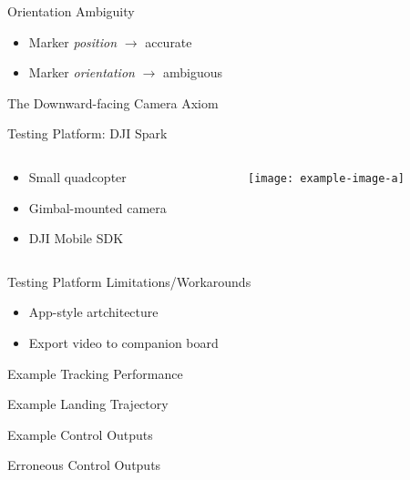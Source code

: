 \documentclass[aspectratio=169]{beamer}
\begin{document}
\begin{frame}{Orientation Ambiguity}
	\begin{itemize}
		\item Marker \emph{position} $\rightarrow$ accurate
		\item Marker \emph{orientation} $\rightarrow$ ambiguous
	\end{itemize}
\end{frame}

\begin{frame}{The Downward-facing Camera Axiom}
\end{frame}

\begin{frame}{Testing Platform: DJI Spark}
	\begin{columns}
	\begin{column}{0.5\textwidth}
	\begin{itemize}
		\item Small quadcopter
		\item Gimbal-mounted camera
		\item DJI Mobile SDK
	\end{itemize}
	\end{column}
	\begin{column}{0.5\textwidth}
		\centering
		\texttt{[image: example-image-a]}
	\end{column}
	\end{columns}
\end{frame}

\begin{frame}{Testing Platform Limitations/Workarounds}
	\begin{itemize}
		\item App-style artchitecture
		\item Export video to companion board
	\end{itemize}
\end{frame}

\begin{frame}{Example Tracking Performance}
\end{frame}

\begin{frame}{Example Landing Trajectory}
\end{frame}

\begin{frame}{Example Control Outputs}
\end{frame}

\begin{frame}{Erroneous Control Outputs}
\end{frame}
\end{document}
